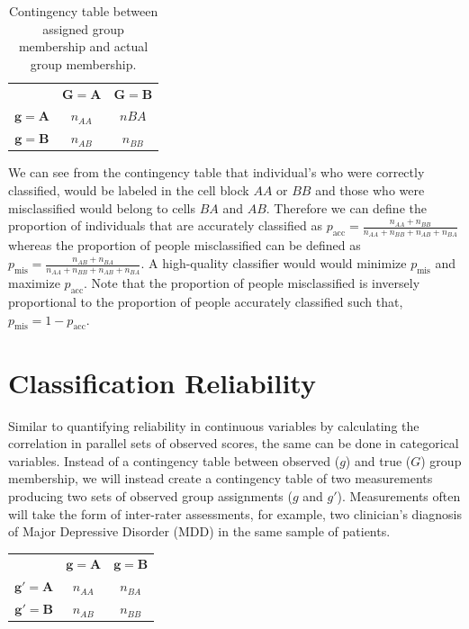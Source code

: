 \documentclass[
  letterpaper,
  DIV=11,
  numbers=noendperiod]{scrreprt}
\begin{document}
\begin{longtable}[]{@{}ccc@{}}
\caption{Contingency table between assigned group membership and actual
group membership.}\label{tbl-class}\tabularnewline
\toprule\noalign{}
\endfirsthead
\endhead
\bottomrule\noalign{}
\endlastfoot
& \(\boldsymbol{G=A}\) & \(\boldsymbol{G=B}\) \\
\(\boldsymbol{g=A}\) & \(n_{AA}\) & \(n{BA}\) \\
\(\boldsymbol{g=B}\) & \(n_{AB}\) & \(n_{BB}\) \\
\end{longtable}

We can see from the contingency table that individual's who were
correctly classified, would be labeled in the cell block \(AA\) or
\(BB\) and those who were misclassified would belong to cells \(BA\) and
\(AB\). Therefore we can define the proportion of individuals that are
accurately classified as
\(p_{\text{acc}} = \frac{n_{AA} + n_{BB}}{n_{AA} + n_{BB} + n_{AB} + n_{BA}}\)
whereas the proportion of people misclassified can be defined as
\(p_{\text{mis}} = \frac{n_{AB} + n_{BA}}{n_{AA} + n_{BB} + n_{AB} + n_{BA}}\).
A high-quality classifier would would minimize \(p_{\text{mis}}\) and
maximize \(p_{\text{acc}}\). Note that the proportion of people
misclassified is inversely proportional to the proportion of people
accurately classified such that, \(p_{\text{mis}} = 1-p_{\text{acc}}\).

\section{Classification Reliability}\label{classification-reliability}

Similar to quantifying reliability in continuous variables by
calculating the correlation in parallel sets of observed scores, the
same can be done in categorical variables. Instead of a contingency
table between observed (\(g\)) and true (\(G\)) group membership, we
will instead create a contingency table of two measurements producing
two sets of observed group assignments (\(g\) and \(g'\)). Measurements
often will take the form of inter-rater assessments, for example, two
clinician's diagnosis of Major Depressive Disorder (MDD) in the same
sample of patients.

\begin{longtable}[]{@{}ccc@{}}
\toprule\noalign{}
\endhead
\bottomrule\noalign{}
\endlastfoot
& \(\boldsymbol{g=A}\) & \(\boldsymbol{g=B}\) \\
\(\boldsymbol{g'=A}\) & \(n_{AA}\) & \(n_{BA}\) \\
\(\boldsymbol{g'=B}\) & \(n_{AB}\) & \(n_{BB}\) \\
\end{longtable}
\end{document}
